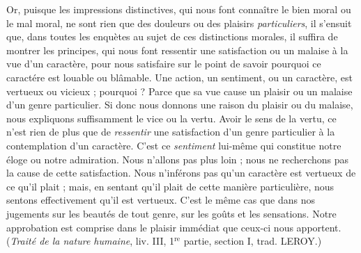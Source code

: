 Or, puisque les impressions distinctives, qui nous font
connaître le bien moral ou le mal moral, ne sont rien que
des douleurs ou des plaisirs {\it particuliers}, il s’ensuit que,
dans toutes les enquètes au sujet de ces distinctions morales,
il suffira de montrer les principes, qui nous font ressentir
une satisfaction ou un malaise à la vue d’un caractère,
pour nous satisfaire sur le point de savoir pourquoi ce
caractére est louable ou blâmable. Une action, un sentiment,
ou un caractère, est vertueux ou vicieux ; pourquoi ?
Parce que sa vue cause un plaisir ou un malaise d’un genre
particulier. Si donc nous donnons une raison du plaisir ou
du malaise, nous expliquons suffisamment le vice ou la
vertu. Avoir le sens de la vertu, ce n’est rien de plus que
de {\it ressentir} une satisfaction d’un genre particulier à la
contemplation d’un caractère. C’est ce {\it sentiment} lui-même
qui constitue notre éloge ou notre admiration. Nous
n’allons pas plus loin ; nous ne recherchons pas la cause
de cette satisfaction. Nous n’inférons pas qu'un caractère
est vertueux de ce qu’il plait ; mais, en sentant qu'il plait
de cette manière particulière, nous sentons effectivement
qu’il est vertueux. C’est le même cas que dans nos jugements
sur les beautés de tout genre, sur les goûts et les
sensations. Notre approbation est comprise dans le plaisir
immédiat que ceux-ci nous apportent. ({\it Traité de la nature
humaine}, liv. III, 1$^\text{re}$ partie, section I, trad. L{\footnotesize EROY}.)

